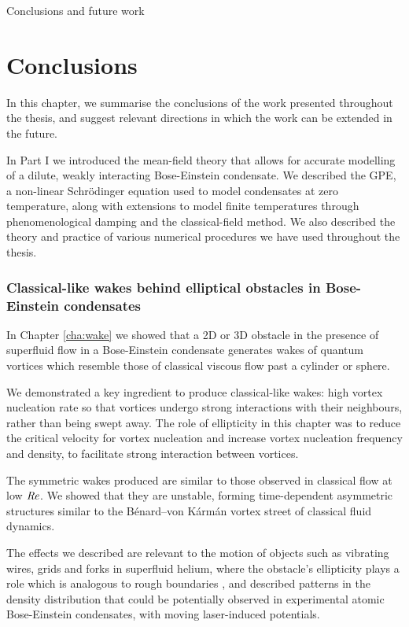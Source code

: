 \begin{chapter}{\label{cha:conc}Conclusions and future work}
\section{Conclusions}
In this chapter, we summarise the conclusions of the work presented throughout the thesis, and suggest relevant directions in which the work can be extended in the future. 

In Part I we introduced the mean-field theory that allows for accurate modelling of a dilute, weakly interacting Bose-Einstein condensate. We described the GPE, a non-linear Schr\"odinger equation used to model condensates at zero temperature, along with extensions to model finite temperatures through phenomenological damping and the classical-field method. We also described the theory and practice of various numerical procedures we have used throughout the thesis.

\subsubsection{Classical-like wakes behind elliptical obstacles in Bose-Einstein condensates}
In Chapter \ref{cha:wake} we showed that a 2D or 3D obstacle in the presence of superfluid flow in a Bose-Einstein condensate generates wakes of quantum vortices which resemble those of classical viscous flow past a cylinder or sphere.

We demonstrated a key ingredient to produce classical-like wakes: high vortex nucleation rate so that vortices undergo strong interactions with their neighbours, rather than being swept away. The role of ellipticity in this chapter was to reduce the critical velocity for vortex nucleation and increase vortex nucleation frequency and density, to facilitate strong interaction between vortices.  

The symmetric wakes produced are similar to those observed in classical flow at low $\mbox{\ensuremath{\mathit{Re}}}$. We showed that they are unstable, forming time-dependent asymmetric structures similar to the B\'enard--von K\'arm\'an vortex street of classical fluid dynamics.

The effects we described are relevant to the motion of objects such as vibrating wires, grids and forks in superfluid helium, where the obstacle's ellipticity plays a role which is analogous to rough boundaries \cite{blaz08,brad05}, and described patterns in the density distribution that could be potentially observed in experimental atomic Bose-Einstein condensates, with moving laser-induced potentials.


\end{chapter}
